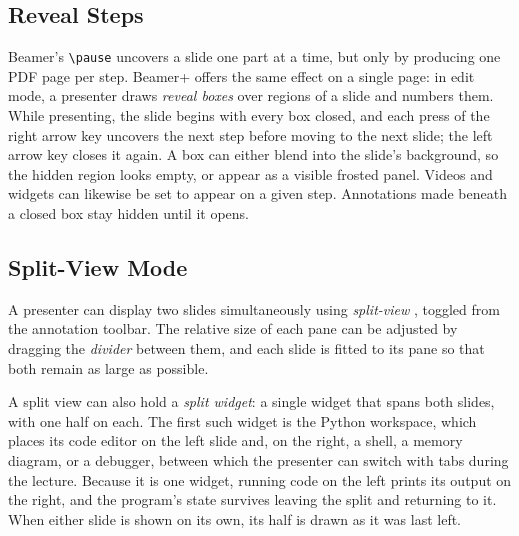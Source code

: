 \documentclass[sigconf]{acmart}
\newcommand{\callout}[1]{%
    \tikz[baseline=(n.base)]{%
        \node[circle, fill=darkgray, draw=black, line width=0.4pt,
              text=white, inner sep=1.5pt, font=\footnotesize\bfseries] (n) {#1};%
    }%
}
\begin{document}
\subsection{Reveal Steps}
\label{sec:reveals}
Beamer's \texttt{\textbackslash pause} uncovers a slide one part at a time, but only by producing one PDF page per step. Beamer+ offers the same effect on a single page: in edit mode, a presenter draws \emph{reveal boxes} over regions of a slide and numbers them. While presenting, the slide begins with every box closed, and each press of the right arrow key uncovers the next step before moving to the next slide; the left arrow key closes it again. A box can either blend into the slide's background, so the hidden region looks empty, or appear as a visible frosted panel. Videos and widgets can likewise be set to appear on a given step. Annotations made beneath a closed box stay hidden until it opens.

\subsection{Split-View Mode}
\label{sec:split-view}
A presenter can display two slides simultaneously using \textit{split-view} \callout{2}, toggled from the annotation toolbar. The relative size of each pane can be adjusted by dragging the \textit{divider} \callout{8} between them, and each slide is fitted to its pane so that both remain as large as possible.

A split view can also hold a \emph{split widget}: a single widget that spans both slides, with one half on each. The first such widget is the Python workspace, which places its code editor on the left slide and, on the right, a shell, a memory diagram, or a debugger, between which the presenter can switch with tabs during the lecture. Because it is one widget, running code on the left prints its output on the right, and the program's state survives leaving the split and returning to it. When either slide is shown on its own, its half is drawn as it was last left.

\end{document}

